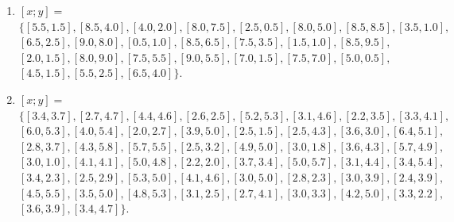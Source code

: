 \documentclass{article}
\begin{document}
\begin{enumerate}[label = \alph*)]

\item $[x; y] = $\\
$\{[5.5, 1.5], [8.5, 4.0], [4.0, 2.0], [8.0, 7.5], [2.5, 0.5], [8.0, 5.0], [8.5, 8.5], [3.5, 1.0], $\\
$[6.5, 2.5], [9.0, 8.0], [0.5, 1.0], [8.5, 6.5], [7.5, 3.5], [1.5, 1.0], [8.5, 9.5], $\\
$[2.0, 1.5], [8.0, 9.0], [7.5, 5.5], [9.0, 5.5], [7.0, 1.5], [7.5, 7.0], [5.0, 0.5], $\\
$[4.5, 1.5], [5.5, 2.5], [6.5, 4.0]\}$.

\item $[x; y] = $\\
$\{[3.4, 3.7], [2.7, 4.7], [4.4, 4.6], [2.6, 2.5], [5.2, 5.3], [3.1, 4.6], [2.2, 3.5], [3.3, 4.1], $\\
$[6.0, 5.3], [4.0, 5.4], [2.0, 2.7], [3.9, 5.0], [2.5, 1.5], [2.5, 4.3], [3.6, 3.0], [6.4, 5.1], $\\
$[2.8, 3.7], [4.3, 5.8], [5.7, 5.5], [2.5, 3.2], [4.9, 5.0], [3.0, 1.8], [3.6, 4.3], [5.7,4.9], $\\
$[3.0, 1.0], [4.1, 4.1], [5.0, 4.8], [2.2, 2.0], [3.7, 3.4], [5.0, 5.7], [3.1, 4.4], [3.4,5.4], $\\
$[3.4, 2.3], [2.5, 2.9], [5.3, 5.0], [4.1,4.6], [3.0, 5.0], [2.8, 2.3], [3.0, 3.9], [2.4, 3.9], $\\
$[4.5, 5.5], [3.5, 5.0], [4.8, 5.3], [3.1, 2.5], [2.7, 4.1], [3.0, 3.3], [4.2, 5.0], [3.3, 2.2], $\\
$[3.6, 3.9], [3.4, 4.7]\}$.
\end{enumerate}
\end{document}
